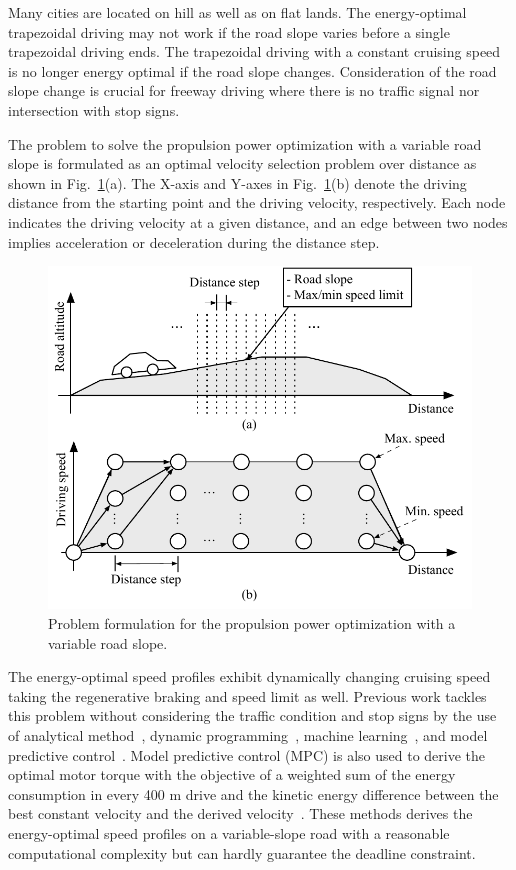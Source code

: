 Many cities are located on hill as well as on flat lands. The energy-optimal trapezoidal driving may not work if the road slope varies before a single trapezoidal driving ends. The trapezoidal driving with a constant cruising speed is no longer energy optimal if the road slope changes. Consideration of the road slope change is crucial for freeway driving where there is no traffic signal nor intersection with stop signs.

The problem to solve the propulsion power optimization with a variable road slope is formulated as an optimal velocity selection problem over distance as shown in Fig.~\ref{fig:formulation}(a). The X-axis and Y-axes in Fig.~\ref{fig:formulation}(b) denote the driving distance from the starting point and the driving velocity, respectively. Each node indicates the driving velocity at a given distance, and an edge between two nodes implies acceleration or deceleration during the distance step.

\begin{figure}
\centering
\includegraphics[width=1.0\hsize]{Figures/Naehyuck_Chang/Discretization.pdf}
\caption{Problem formulation for the propulsion power optimization with a variable road slope.}
\label{fig:formulation}
\end{figure}      

The energy-optimal speed profiles exhibit dynamically changing cruising speed taking the regenerative braking and speed limit as well. Previous work tackles this problem without considering the traffic condition and stop signs by the use of analytical method~\cite{Kamal:TITS11,Ozatay:IFAC14}, dynamic programming~\cite{Ozatay:TITS14}, machine learning~\cite{Khayyam:ESA12}, and model predictive control~\cite{Schwickart:JFI15}. Model predictive control (MPC) is also used to derive the optimal motor torque with the objective of a weighted sum of the energy consumption in every 400 m drive and the kinetic energy difference between the best constant velocity and the derived velocity~\cite{Schwickart:JFI15}. These methods derives the energy-optimal speed profiles on a variable-slope road with a reasonable computational complexity but can hardly guarantee the deadline constraint.

